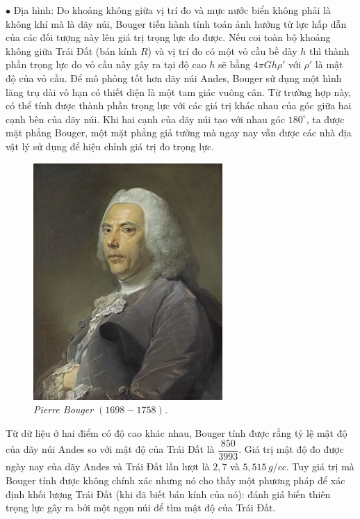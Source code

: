 \begin{multicols}{2}
	\vskip 0.1cm
	$\bullet$ Địa hình: Do khoảng không giữa vị trí đo và mực nước biển không phải là không khí mà là dãy núi, Bouger tiến hành tính toán ảnh hưởng từ lực hấp dẫn của các đối tượng này lên giá trị trọng lực đo được. Nếu coi toàn bộ khoảng không giữa Trái Đất (bán kính $R$) và vị trí đo có một vỏ cầu bề dày $h$ thì thành phần trọng lực do vỏ cầu này gây ra tại độ cao $h$ sẽ bằng $4\pi Gh\rho'$ với $\rho'$ là mật độ của vỏ cầu. Để mô phỏng tốt hơn dãy núi Andes, Bouger sử dụng một hình lăng trụ dài vô hạn có thiết diện là một tam giác vuông cân. Từ trường hợp này, có thể tính được thành phần trọng lực với các giá trị khác nhau của góc giữa hai cạnh bên của dãy núi. Khi hai cạnh của dãy núi tạo với nhau góc $180^\circ$, ta được mặt phẳng Bouger, một mặt phẳng giả tưởng mà ngay nay vẫn được các nhà địa vật lý sử dụng để hiệu chỉnh giá trị đo trọng lực.
	\begin{figure}[H]
		\vspace*{-5pt}
		\centering
		\captionsetup{labelformat= empty, justification=centering}
		\includegraphics[width =0.75\linewidth]{7}
		\caption{\small\textit{\color{timhieukhoahoc}Pierre Bouger $(1698 - 1758)$.}}
		\vspace*{-10pt}
	\end{figure}
	Từ dữ liệu ở hai điểm có độ cao khác nhau, Bouger tính được rằng tỷ lệ mật độ của dãy núi Andes so với mật độ của Trái Đất là $\dfrac{850}{3993}$. Giá trị mật độ đo được ngày nay của dãy Andes và Trái Đất lần lượt là $2{,}7$ và $5{,}515\, g/cc$. Tuy giá trị mà Bouger tính được không chính xác nhưng nó cho thấy một phương pháp để xác định khối lượng Trái Đất (khi đã biết bán kính của nó): đánh giá biến thiên trọng lực gây ra bởi một ngọn núi để tìm mật độ của Trái Đất.

\end{multicols}
